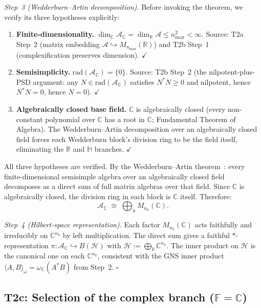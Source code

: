 \documentclass[11pt]{article}
\theoremstyle{remark}
\begin{document}
\begin{tcolorbox}[apfbox, title={T2b: Complexification and Wedderburn Decomposition}]
\textit{Step~3 (Wedderburn--Artin decomposition).}  Before invoking the theorem, we verify its three hypotheses explicitly:
\begin{enumerate}[nosep,leftmargin=2em,itemsep=2pt]
  \item \textbf{Finite-dimensionality.} $\dim_\mathbb{C} \mathcal{A}_\mathbb{C} = \dim_\mathbb{R} \mathcal{A} \le n_{\max}^2 < \infty$.  Source: T2a Step~2 (matrix embedding $\mathcal{A} \hookrightarrow M_{n_{\max}}(\mathbb{R})$) and T2b Step~1 (complexification preserves dimension).  $\checkmark$
  \item \textbf{Semisimplicity.} $\mathrm{rad}(\mathcal{A}_\mathbb{C}) = \{0\}$.  Source: T2b Step~2 (the nilpotent-plus-PSD argument: any $N \in \mathrm{rad}(\mathcal{A}_\mathbb{C})$ satisfies $N^*N \ge 0$ and nilpotent, hence $N^*N = 0$, hence $N = 0$).  $\checkmark$
  \item \textbf{Algebraically closed base field.} $\mathbb{C}$ is algebraically closed (every non-constant polynomial over $\mathbb{C}$ has a root in $\mathbb{C}$; Fundamental Theorem of Algebra).  The Wedderburn--Artin decomposition over an algebraically closed field forces each Wedderburn block's division ring to be the field itself, eliminating the $\mathbb{R}$ and $\mathbb{H}$ branches.  $\checkmark$
\end{enumerate}
All three hypotheses are verified.  By the Wedderburn--Artin theorem~\cite{Wedderburn1908,Artin1927}: every finite-dimensional semisimple algebra over an algebraically closed field decomposes as a direct sum of full matrix algebras over that field.  Since $\mathbb{C}$ is algebraically closed, the division ring in each block is $\mathbb{C}$ itself.  Therefore:
\[
\mathcal{A}_\mathbb{C} \;\cong\; \bigoplus_k M_{n_k}(\mathbb{C}).
\]

\textit{Step~4 (Hilbert-space representation).}  Each factor $M_{n_k}(\mathbb{C})$ acts faithfully and irreducibly on $\mathbb{C}^{n_k}$ by left multiplication.  The direct sum gives a faithful $*$-representation $\pi: \mathcal{A}_\mathbb{C} \hookrightarrow B(\mathcal{H})$ with $\mathcal{H} := \bigoplus_k \mathbb{C}^{n_k}$.  The inner product on $\mathcal{H}$ is the canonical one on each $\mathbb{C}^{n_k}$, consistent with the GNS inner product $\langle A, B\rangle_\omega = \omega_\mathbb{C}(A^*B)$ from Step~2.  \hfill$\square$
\end{tcolorbox}

\subsection{T2c: Selection of the complex branch ($\mathbb{F} = \mathbb{C}$)}
\label{sec:T2c}
\end{document}
